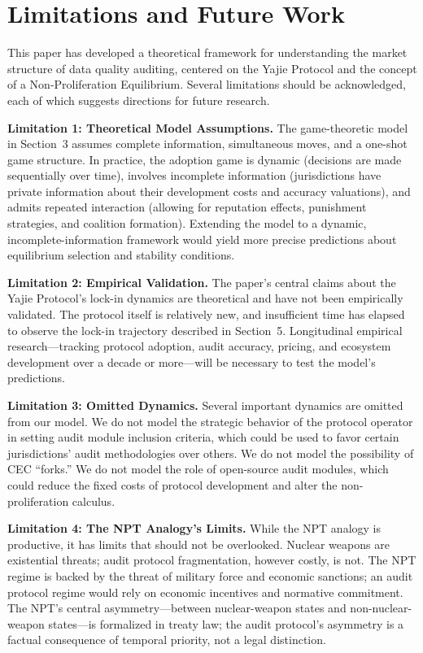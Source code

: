 \documentclass[12pt,a4paper]{ctexart}
\theoremstyle{definition}
\theoremstyle{remark}
\begin{document}
\section{Limitations and Future Work}

This paper has developed a theoretical framework for understanding the market structure of data quality auditing, centered on the Yajie Protocol and the concept of a Non-Proliferation Equilibrium. Several limitations should be acknowledged, each of which suggests directions for future research.

\textbf{Limitation 1: Theoretical Model Assumptions.} The game-theoretic model in Section~3 assumes complete information, simultaneous moves, and a one-shot game structure. In practice, the adoption game is dynamic (decisions are made sequentially over time), involves incomplete information (jurisdictions have private information about their development costs and accuracy valuations), and admits repeated interaction (allowing for reputation effects, punishment strategies, and coalition formation). Extending the model to a dynamic, incomplete-information framework would yield more precise predictions about equilibrium selection and stability conditions.

\textbf{Limitation 2: Empirical Validation.} The paper's central claims about the Yajie Protocol's lock-in dynamics are theoretical and have not been empirically validated. The protocol itself is relatively new, and insufficient time has elapsed to observe the lock-in trajectory described in Section~5. Longitudinal empirical research—tracking protocol adoption, audit accuracy, pricing, and ecosystem development over a decade or more—will be necessary to test the model's predictions.

\textbf{Limitation 3: Omitted Dynamics.} Several important dynamics are omitted from our model. We do not model the strategic behavior of the protocol operator in setting audit module inclusion criteria, which could be used to favor certain jurisdictions' audit methodologies over others. We do not model the possibility of CEC ``forks.'' We do not model the role of open-source audit modules, which could reduce the fixed costs of protocol development and alter the non-proliferation calculus.

\textbf{Limitation 4: The NPT Analogy's Limits.} While the NPT analogy is productive, it has limits that should not be overlooked. Nuclear weapons are existential threats; audit protocol fragmentation, however costly, is not. The NPT regime is backed by the threat of military force and economic sanctions; an audit protocol regime would rely on economic incentives and normative commitment. The NPT's central asymmetry—between nuclear-weapon states and non-nuclear-weapon states—is formalized in treaty law; the audit protocol's asymmetry is a factual consequence of temporal priority, not a legal distinction.
\end{document}
